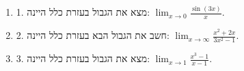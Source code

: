 \documentclass[12pt]{article}
\begin{document}
        \begin{enumerate}
        \item 1. מצא את הגבול בעזרת כלל היינה: $\lim_{x \to 0} \frac{\sin(3x)}{x}$.
\item 2. חשב את הגבול הבא בעזרת כלל היינה: $\lim_{x \to \infty} \frac{x^2 + 2x}{3x^2 - 1}$.
\item 3.  מצא את הגבול בעזרת כלל היינה: $\lim_{x \to 1} \frac{x^3 - 1}{x - 1}$.
        \end{enumerate}
        
\end{document}

